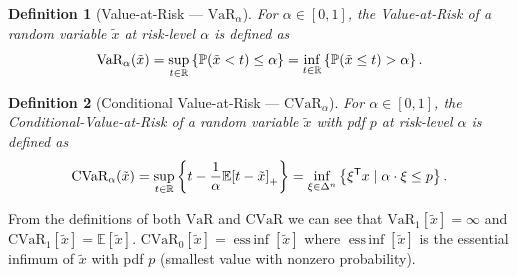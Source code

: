 \documentclass[10pt]{article}
\newtheorem{definition}{Definition}
\newcommand{\cvar}{\text{CVaR}}
\newcommand{\cvaralpha}{\text{CVaR}_\alpha}
\newcommand{\var}{\text{VaR}}
\newcommand{\varalpha}{\text{VaR}_\alpha}
\theoremstyle{plain}
\theoremstyle{remark}
\DeclareMathOperator*{\essinf}{ess\,inf}
\begin{document}
\begin{definition}[Value-at-Risk --- $\varalpha$]\label{def:var}
        For $\alpha \in [0, 1]$, the Value-at-Risk of a random variable 
        $\tilde{x}$ at risk-level $\alpha$ is defined as
        \[
                \normalfont{\varalpha(\tilde{x})} = \sup_{t \in \Real} \left\{ \mathbb{P}(\tilde{x} < t) \leq \alpha \right\} = \inf_{t \in \Real} \left\{ \mathbb{P}(\tilde{x} \leq t) > \alpha \right\}.
        \]
\end{definition}

\begin{definition}[Conditional Value-at-Risk --- $\cvaralpha$]\label{def:cvar}
        For $\alpha \in [0, 1]$, the Conditional-Value-at-Risk of a random variable 
        $\tilde{x}$ with pdf $p$ at risk-level $\alpha$ is defined as
        \[
                \normalfont{\cvaralpha(\tilde{x})} = \sup_{t \in \Real} \left\{ t - \frac{1}{\alpha} \mathbb{E}{[t - \tilde{x}]}_+ \right\} =
                \inf_{\xi \in \Delta^n} \left\{ \xi\tr x \mid \alpha \cdot \xi \leq p \right\}.
        \]
\end{definition}

From the definitions of both $\var$ and $\cvar$ we can see that $\var_1[\tilde{x}] = \infty$ and $\cvar_1[\tilde{x}] = \mathbb{E}[\tilde{x}]$.
$\cvar_0[\tilde{x}] = \essinf[\tilde{x}]$ where $\essinf[\tilde{x}]$ is the essential infimum of $\tilde{x}$ with pdf $p$ (smallest value with nonzero probability).
\end{document}
